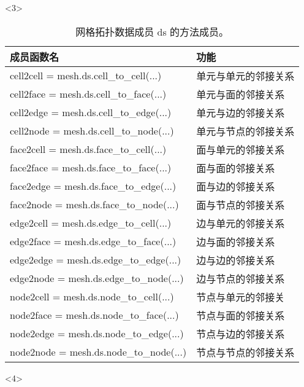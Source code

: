 \documentclass{beamer}
\numberwithin{subsection}{section}
\begin{document}
\begin{frame}
\begin{onlyenv}<3>
    \begin{table}[H]
        \tiny
        \centering
        \begin{tabular}{|l|l|}\hline
            成员函数名 & 功能\\\hline
            cell2cell = mesh.ds.cell\_to\_cell(...) &单元与单元的邻接关系\\\hline
            cell2face = mesh.ds.cell\_to\_face(...) &单元与面的邻接关系\\\hline
            cell2edge = mesh.ds.cell\_to\_edge(...) &单元与边的邻接关系\\\hline
            cell2node = mesh.ds.cell\_to\_node(...) &单元与节点的邻接关系\\\hline
            face2cell = mesh.ds.face\_to\_cell(...) &面与单元的邻接关系\\\hline
            face2face = mesh.ds.face\_to\_face(...) &面与面的邻接关系\\\hline
            face2edge = mesh.ds.face\_to\_edge(...) &面与边的邻接关系\\\hline
            face2node = mesh.ds.face\_to\_node(...) &面与节点的邻接关系\\\hline
            edge2cell = mesh.ds.edge\_to\_cell(...) &边与单元的邻接关系\\\hline
            edge2face = mesh.ds.edge\_to\_face(...) &边与面的邻接关系\\\hline
            edge2edge = mesh.ds.edge\_to\_edge(...) &边与边的邻接关系\\\hline
            edge2node = mesh.ds.edge\_to\_node(...) &边与节点的邻接关系\\\hline
            node2cell = mesh.ds.node\_to\_cell(...) &节点与单元的邻接关\\\hline
            node2face = mesh.ds.node\_to\_face(...) &节点与面的邻接关系\\\hline
            node2edge = mesh.ds.node\_to\_edge(...) &节点与边的邻接关系\\\hline
            node2node = mesh.ds.node\_to\_node(...) &节点与节点的邻接关系\\\hline
        \end{tabular}
        \caption{网格拓扑数据成员 ds 的方法成员。} 
    \end{table}
\end{onlyenv}
\begin{onlyenv}<4>
    \begin{table}[H]
    \tiny
    \centering
    \begin{tabular}{|l|l|}\hline

\end{tabular}
\end{table}
\end{onlyenv}
\end{frame}
\end{document}
